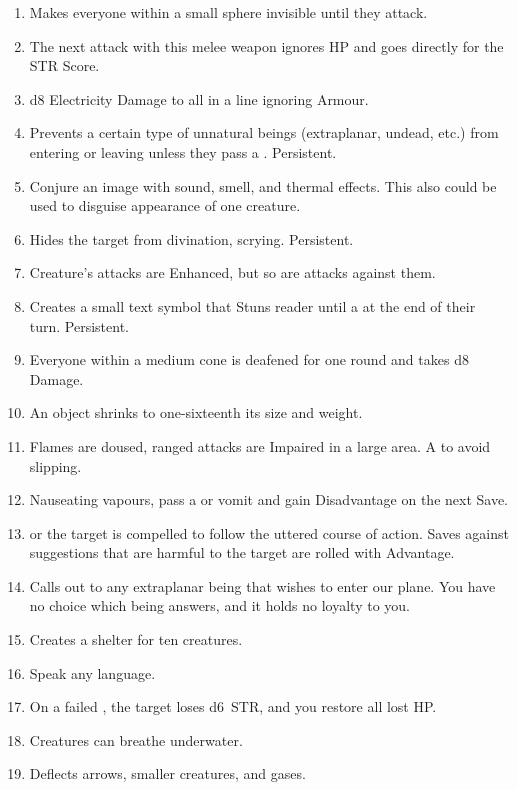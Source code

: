 \documentclass[itdr]{subfiles}
\begin{document}
\begin{enumerate}
	\item {} Makes everyone within a small sphere invisible until they attack.
	\item {} The next attack with this melee weapon ignores HP and goes directly for the STR Score.
	\item {} d8 Electricity Damage to all in a line ignoring Armour.
	\vfill
	\break
	\item {} Prevents a certain type of unnatural beings (extraplanar, undead, etc.) from entering or leaving unless they pass a . Persistent.
	\item {} Conjure an image with sound, smell, and thermal effects. This also could be used to disguise appearance of one creature.
	\item {} Hides the target from divination, scrying. Persistent.
	\item {} Creature's attacks are Enhanced, but so are attacks against them.
	\item {} Creates a small text symbol that Stuns reader until a  at the end of their turn. Persistent.
	\item {} Everyone within a medium cone is deafened for one round and takes d8 Damage.
	\item {} An object shrinks to one-sixteenth its size and weight.
	\item {} Flames are doused, ranged attacks are Impaired in a large area. A  to avoid slipping.
	\item {} Nauseating vapours, pass a  or vomit and gain Disadvantage on the next Save.
	\item {}  or the target is \mbox{compelled} to follow the uttered course of action. Saves against suggestions that are harmful to the target are rolled with Advantage.
	\item {} Calls out to any extraplanar being that wishes to enter our plane. You have no choice which being answers, and it holds no loyalty to you.
	\item {} Creates a shelter for ten creatures.
	\item {} Speak any language.
	\item {} On a failed , the target loses d6~STR, and you restore all lost HP.
	\item {} Creatures can breathe underwater.
	\item {} Deflects arrows, smaller creatures, and gases.
\end{enumerate}
\end{document}

